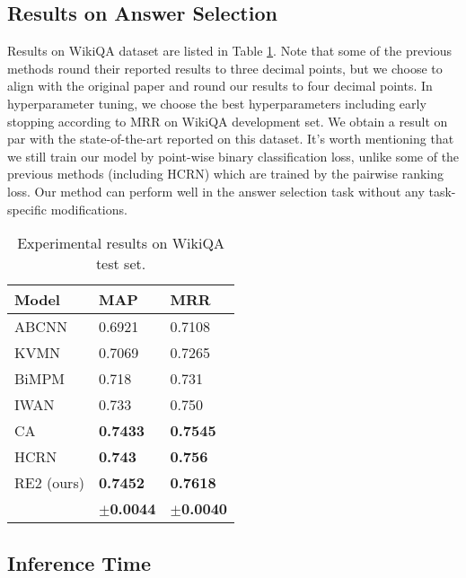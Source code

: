 \documentclass[11pt,a4paper]{article}
\begin{document}
\subsection{Results on Answer Selection}
Results on WikiQA dataset are listed in Table \ref{tab:wikiqa-result}. Note that some of the previous methods round their reported results to three decimal points, but we choose to align with the original paper \cite{wikiqa} and round our results to four decimal points. In hyperparameter tuning, we choose the best hyperparameters including early stopping according to MRR on WikiQA development set. We obtain a result on par with the state-of-the-art reported on this dataset. It's worth mentioning that we still train our model by point-wise binary classification loss, unlike some of the previous methods (including HCRN) which are trained by the pairwise ranking loss. Our method can perform well in the answer selection task without any task-specific modifications. 

\begin{table}
  \centering
  \small
  \begin{tabular}{|l|l|l|}
  \hline
  {\bf Model} & {\bf MAP} & {\bf MRR}\\\hline
  ABCNN \cite{yin2016abcnn} & 0.6921 & 0.7108 \\
  KVMN \cite{miller2016key} & 0.7069 & 0.7265 \\
  BiMPM \cite{wang2017bilateral} & 0.718 & 0.731 \\
  IWAN \cite{shen2017inter} & 0.733 & 0.750 \\
  CA \cite{wang2017compare} & {\bf 0.7433} & {\bf 0.7545} \\
  HCRN \cite{tay2018hermitian} & {\bf 0.743} & {\bf 0.756} \\\hline
  RE2 (ours) & {\bf 0.7452} & {\bf 0.7618}\\
  & {\bf $\pm$0.0044} & {\bf $\pm$0.0040}\\\hline
  \end{tabular}
  \caption{Experimental results on WikiQA test set.}\label{tab:wikiqa-result}
\end{table}

\subsection{Inference Time}
\end{document}
